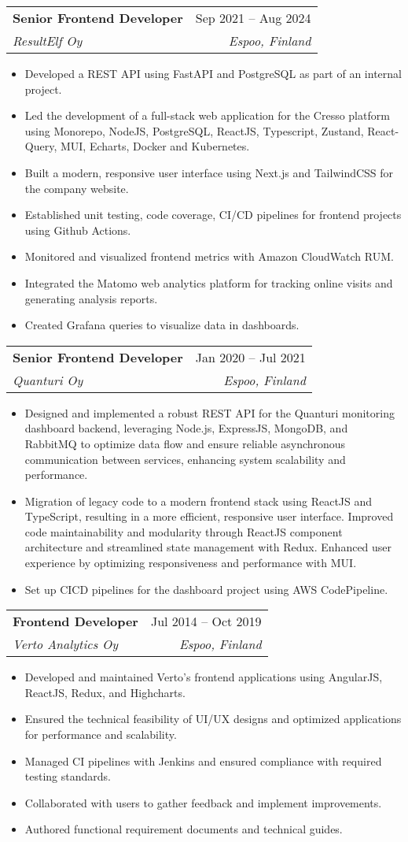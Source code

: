 \documentclass[letterpaper,11pt]{article}
\makeatletter
\newcommand{\resumeItem}[1]{
  \item\small{
    {#1 \vspace{-2pt}}
  }
}
\newcommand{\resumeSubheading}[4]{
  \vspace{-2pt}\item
    \begin{tabular*}{0.97\textwidth}[t]{l@{\extracolsep{\fill}}r}
      \textbf{#1} & #2 \\
      \textit{\small#3} & \textit{\small #4} \\
    \end{tabular*}\vspace{-7pt}
}
\newcommand{\resumeItemListStart}{\begin{itemize}}
\newcommand{\resumeItemListEnd}{\end{itemize}\vspace{-5pt}}
\makeatother
\begin{document}
    \resumeSubheading
      {Senior Frontend Developer}{Sep 2021 -- Aug 2024}
      {ResultElf Oy}{Espoo, Finland}
      \resumeItemListStart
        \resumeItem{Developed a REST API using FastAPI and PostgreSQL as part of an internal project.}
        \resumeItem{Led the development of a full-stack web application for the Cresso platform using Monorepo, NodeJS, PostgreSQL, ReactJS, Typescript, Zustand, React-Query, MUI, Echarts, Docker and Kubernetes.}
        \resumeItem{Built a modern, responsive user interface using Next.js and TailwindCSS for the company website.}
        \resumeItem{Established unit testing, code coverage, CI/CD pipelines for frontend projects using Github Actions.}
        \resumeItem{Monitored and visualized frontend metrics with Amazon CloudWatch RUM.}
        \resumeItem{Integrated the Matomo web analytics platform for tracking online visits and generating analysis reports.}
        \resumeItem{Created Grafana queries to visualize data in dashboards.}
      \resumeItemListEnd

    \resumeSubheading
      {Senior Frontend Developer}{Jan 2020 -- Jul 2021}
      {Quanturi Oy}{Espoo, Finland}
      \resumeItemListStart
        \resumeItem{Designed and implemented a robust REST API for the Quanturi monitoring dashboard backend, leveraging Node.js, ExpressJS, MongoDB, and RabbitMQ to optimize data flow and ensure reliable asynchronous communication between services, enhancing system scalability and performance.}
        \resumeItem{Migration of legacy code to a modern frontend stack using ReactJS and TypeScript, resulting in a more efficient, responsive user interface. Improved code maintainability and modularity through ReactJS component architecture and streamlined state management with Redux. Enhanced user experience by optimizing responsiveness and performance with MUI.}
        \resumeItem{Set up CICD pipelines for the dashboard project using AWS CodePipeline.}
      \resumeItemListEnd

    \resumeSubheading
      {Frontend Developer}{Jul 2014 -- Oct 2019}
      {Verto Analytics Oy}{Espoo, Finland}
      \resumeItemListStart
        \resumeItem{Developed and maintained Verto's frontend applications using AngularJS, ReactJS, Redux, and Highcharts.}
        \resumeItem{Ensured the technical feasibility of UI/UX designs and optimized applications for performance and scalability.}
        \resumeItem{Managed CI pipelines with Jenkins and ensured compliance with required testing standards.}
        \resumeItem{Collaborated with users to gather feedback and implement improvements.}
        \resumeItem{Authored functional requirement documents and technical guides.}
      \resumeItemListEnd
\end{document}
